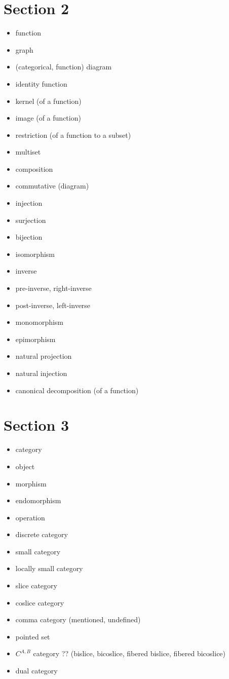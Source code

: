 \section*{Section 2}

\begin{itemize}
	\item function
	\item graph
	\item (categorical, function) diagram
	\item identity function
	\item kernel (of a function)
	\item image (of a function)
	\item restriction (of a function to a subset)
	\item multiset
	\item composition
	\item commutative (diagram)
	\item injection
	\item surjection
	\item bijection
	\item isomorphism
	\item inverse
	\item pre-inverse, right-inverse
	\item post-inverse, left-inverse
	\item monomorphism
	\item epimorphism
	\item natural projection
	\item natural injection
	\item canonical decomposition (of a function)
\end{itemize}


\section*{Section 3}

\begin{itemize}
	\item category
	\item object
	\item morphism
	\item endomorphism
	\item operation
	\item discrete category
	\item small category
	\item locally small category
	\item slice category
	\item coslice category
	\item comma category (mentioned, undefined)
	\item pointed set
	\item $C^{A, B}$ category ?? (bislice, bicoslice, fibered bislice, fibered bicoslice)
	\item dual category
\end{itemize}


